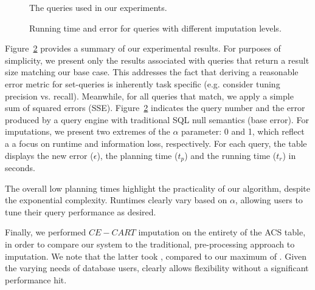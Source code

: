 \begin{figure}
  \centerfloat
  
  \caption{The queries used in our experiments.}
  \label{fig:queries}
\end{figure}

\begin{figure}
  \centerfloat
  
  \caption{Running time and error for queries with different imputation levels.}
  \label{fig:experiments}
\end{figure}

Figure~\ref{fig:experiments} provides a summary of our experimental results. For purposes of simplicity, we present only the results associated with
queries that return a result size matching our base case. This addresses the fact that deriving a reasonable error metric for set-queries 
is inherently task specific (e.g. consider tuning precision vs. recall). Meanwhile, for all queries that match, we apply a simple sum of squared errors
(SSE). Figure~\ref{fig:experiments} indicates the query number and the error produced by a query engine with traditional SQL null semantics (base error).
For imputations, we present two extremes of the $\alpha$ parameter: 0 and 1, which reflect a a focus on runtime and information loss, respectively.
For each query, the table displays the new error ($\epsilon$), the planning time ($t_p$) and the running time ($t_r$) in seconds.

The overall low planning times highlight the practicality of our algorithm, despite the exponential complexity. Runtimes clearly vary based on $\alpha$, allowing
users to tune their query performance as desired.


Finally, we performed $CE-CART$ imputation on the entirety of the ACS table, in order to compare our system to the traditional, pre-processing approach to imputation.
We note that the latter took , compared to our maximum of . Given the varying needs of database users, \ProjectName{} clearly allows flexibility without
a significant performance hit.


